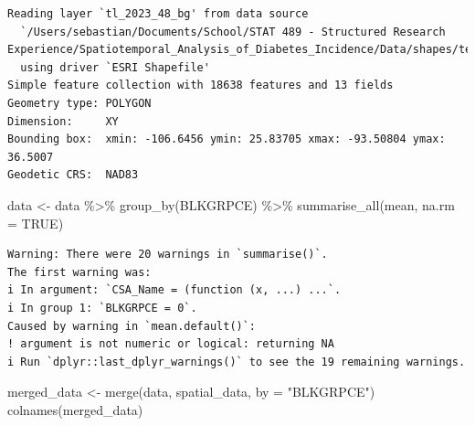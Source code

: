 \documentclass[
  letterpaper,
  DIV=11,
  numbers=noendperiod]{scrartcl}
\newenvironment{Shaded}{\begin{snugshade}}{\end{snugshade}}
\newcommand{\AttributeTok}[1]{\textcolor[rgb]{0.40,0.45,0.13}{#1}}
\newcommand{\ConstantTok}[1]{\textcolor[rgb]{0.56,0.35,0.01}{#1}}
\newcommand{\FunctionTok}[1]{\textcolor[rgb]{0.28,0.35,0.67}{#1}}
\newcommand{\NormalTok}[1]{\textcolor[rgb]{0.00,0.23,0.31}{#1}}
\newcommand{\OtherTok}[1]{\textcolor[rgb]{0.00,0.23,0.31}{#1}}
\newcommand{\SpecialCharTok}[1]{\textcolor[rgb]{0.37,0.37,0.37}{#1}}
\newcommand{\StringTok}[1]{\textcolor[rgb]{0.13,0.47,0.30}{#1}}
\begin{document}
\begin{verbatim}
Reading layer `tl_2023_48_bg' from data source 
  `/Users/sebastian/Documents/School/STAT 489 - Structured Research Experience/Spatiotemporal_Analysis_of_Diabetes_Incidence/Data/shapes/texas' 
  using driver `ESRI Shapefile'
Simple feature collection with 18638 features and 13 fields
Geometry type: POLYGON
Dimension:     XY
Bounding box:  xmin: -106.6456 ymin: 25.83705 xmax: -93.50804 ymax: 36.5007
Geodetic CRS:  NAD83
\end{verbatim}

\begin{Shaded}
\begin{Highlighting}[]
\NormalTok{data }\OtherTok{\textless{}{-}}\NormalTok{ data }\SpecialCharTok{\%\textgreater{}\%}
  \FunctionTok{group\_by}\NormalTok{(BLKGRPCE) }\SpecialCharTok{\%\textgreater{}\%}
  \FunctionTok{summarise\_all}\NormalTok{(mean, }\AttributeTok{na.rm =} \ConstantTok{TRUE}\NormalTok{)}
\end{Highlighting}
\end{Shaded}

\begin{verbatim}
Warning: There were 20 warnings in `summarise()`.
The first warning was:
i In argument: `CSA_Name = (function (x, ...) ...`.
i In group 1: `BLKGRPCE = 0`.
Caused by warning in `mean.default()`:
! argument is not numeric or logical: returning NA
i Run `dplyr::last_dplyr_warnings()` to see the 19 remaining warnings.
\end{verbatim}

\begin{Shaded}
\begin{Highlighting}[]
\NormalTok{merged\_data }\OtherTok{\textless{}{-}} \FunctionTok{merge}\NormalTok{(data, spatial\_data, }\AttributeTok{by =} \StringTok{"BLKGRPCE"}\NormalTok{)}
\FunctionTok{colnames}\NormalTok{(merged\_data)}
\end{Highlighting}
\end{Shaded}
\end{document}
